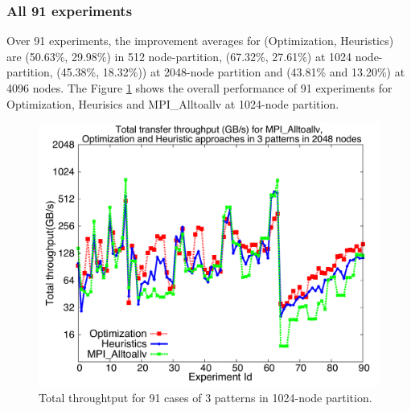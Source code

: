 \subsubsection{All 91 experiments}

Over 91 experiments, the improvement averages for (Optimization, Heuristics)  are (50.63\%, 29.98\%) in 512 node-partition, (67.32\%, 27.61\%) at 1024 node-partition, (45.38\%, 18.32\%)) at 2048-node partition and (43.81\% and 13.20\%) at 4096 nodes. The Figure \ref{fig:alltests_1k} shows the overall performance of 91 experiments for Optimization, Heurisics and MPI\_Alltoallv at 1024-node partition.

\begin{figure}[!htb]
\vspace{-0.1in}
\centering
\includegraphics[scale=0.30]{figures/alltests_1k.pdf}
\vspace{-0.1in}
\caption{Total throughtput for 91 cases of 3 patterns in 1024-node partition.}
\vspace{-0.1in}
\label{fig:alltests_1k}
\end{figure}
